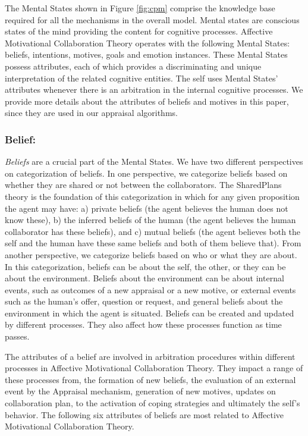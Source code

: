 \documentclass[letterpaper]{article}
\begin{document}
The Mental States shown in Figure \ref{fig:cpm} comprise the knowledge base
required for all the mechanisms in the overall model. Mental states are
conscious states of the mind providing the content for cognitive processes.
Affective Motivational Collaboration Theory operates with the following Mental
States: beliefs, intentions, motives, goals and emotion instances. These Mental
States possess attributes, each of which provides a discriminating and unique
interpretation of the related cognitive entities. The self uses Mental States'
attributes whenever there is an arbitration in the internal cognitive processes.
We provide more details about the attributes of beliefs and motives in this
paper, since they are used in our appraisal algorithms.

\subsubsection{Belief:}

\textit{Beliefs} are a crucial part of the Mental States. We have two different
perspectives on categorization of beliefs. In one perspective, we categorize
beliefs based on whether they are shared or not between the collaborators. The
SharedPlans \cite{grosz:plans-discourse} theory is the foundation of this
categorization in which for any given proposition the agent may have: a) private
beliefs (the agent believes the human does not know these), b) the inferred
beliefs of the human (the agent believes the human collaborator has these
beliefs), and c) mutual beliefs (the agent believes both the self and the human
have these same beliefs and both of them believe that). From another
perspective, we categorize beliefs based on who or what they are about. In this
categorization, beliefs can be about the self, the other, or they can be about
the environment. Beliefs about the environment can be about internal events,
such as outcomes of a new appraisal or a new motive, or external events such as
the human's offer, question or request, and general beliefs about the
environment in which the agent is situated. Beliefs can be created and updated
by different processes. They also affect how these processes function as time
passes.

The attributes of a belief are involved in arbitration procedures within
different processes in Affective Motivational Collaboration Theory. They impact
a range of these processes from, the formation of new beliefs, the evaluation of
an external event by the Appraisal mechanism, generation of new motives, updates
on collaboration plan, to the activation of coping strategies and ultimately the
self's behavior. The following six attributes of beliefs are most related to
Affective Motivational Collaboration Theory.
\end{document}

